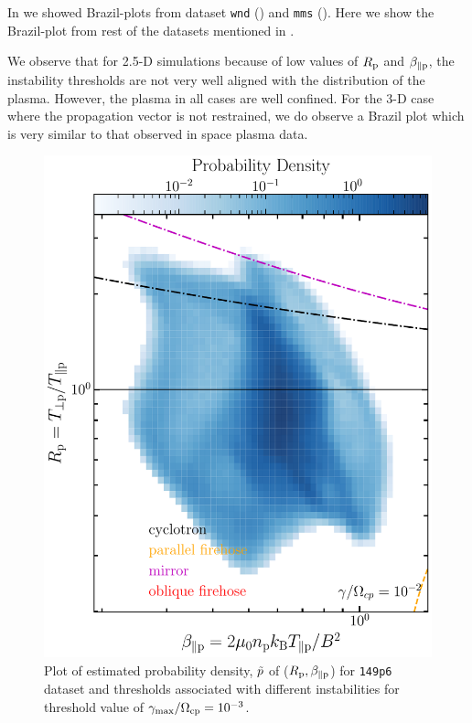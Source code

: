 %
%
 \label{apdx:A}

    In  we showed Brazil-plots from dataset \texttt{wnd} ()
    and \texttt{mms} (). Here we show the Brazil-plot from rest of the
    datasets mentioned in .
    
    We observe that for 2.5-D simulations because of low values of $R_{\rm p}$ and $\beta_{\parallel
    \rm p}$, the instability thresholds are not very well aligned with the distribution of the
    plasma. However, the plasma in all cases are well confined. For the 3-D case where the
    propagation vector is not restrained, we do observe a Brazil plot which is very similar to that
    observed in space plasma data.
    \begin{figure}
        \begin{center}
            \includegraphics[width=1\textwidth]{figures/apdxA/brazil_prob_2dip.pdf}
            \caption[Brazil-plot of \texttt{149p6} dataset]{Plot of estimated probability density,
            $\Tilde{p}$ of ($R_{\rm p}, \beta_{\parallel \rm p}$) for \texttt{149p6} dataset and
            thresholds associated with different instabilities for threshold value of
            $\gamma_{\max}/\Omega_{\rm cp} = 10^{-3}$.}
            \label{fig:brazil_prob_2dip}
        \end{center}
    \end{figure}

